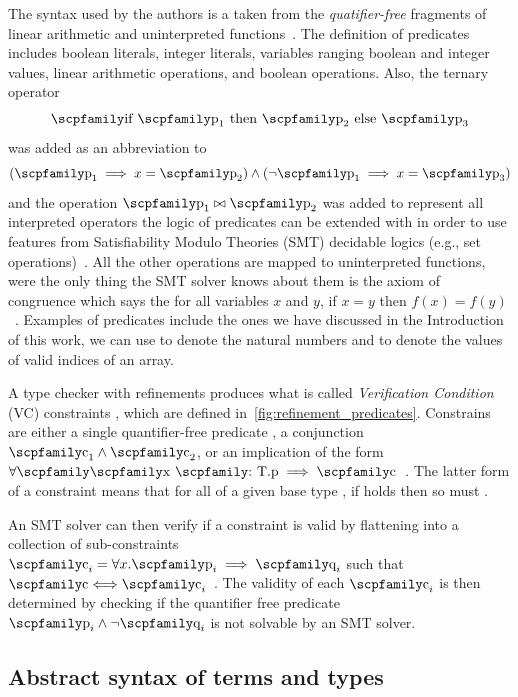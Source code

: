 \documentclass[
  oneside,
  english,
  coorientadorbanca,
  noabntexcite
]{ufsc-thesis-rn46-2019}
\newcommand{\codett}[1]{\text{\scpfamily#1}}
\newcommand{\code}[1]{\text{\scpfamily\setlength\spaceskip{0.35em}#1}}
\newcommand{\typer}[2]{\code{#1 \codett{:} #2}}
\begin{document}
The syntax used by the authors is a taken from the \textit{quatifier-free} fragments of linear arithmetic and uninterpreted functions~\cite{jhala2020tutorial}.
The definition of predicates \code{p} includes boolean literals, integer literals, variables ranging boolean and integer values, linear arithmetic operations, and boolean operations.
Also, the ternary operator
\begin{equation*}
  \code{if $\code{p}_1$ then $\code{p}_2$ else $\code{p}_3$}
\end{equation*}
was added as an abbreviation to
\begin{equation*}
  (\code{p}_1 \implies x = \code{p}_2)\land(\lnot \code{p}_1 \implies x = \code{p}_3)
\end{equation*}
and the operation $\code{p}_1\bowtie\code{p}_2$ was added to represent all interpreted operators the logic of predicates can be extended with in order to use features from Satisfiability Modulo Theories (SMT) decidable logics (e.g., set operations)~\cite{jhala2020tutorial}.
All the other operations are mapped to uninterpreted functions, were the only thing the SMT solver knows about them is the axiom of congruence which says the for all variables $x$ and $y$, if $x = y$ then $f(x) = f(y)$~\cite{jhala2020tutorial}.
Examples of predicates include the ones we have discussed in the Introduction of this work, we can use \code{0 <= v} to denote the natural numbers and \code{0 <= v \&\& v = length(x)} to denote the values of valid indices of an array.

A type checker with refinements produces what is called \textit{Verification Condition} (VC) constraints \code{c}, which are defined in~\cref{fig:refinement_predicates}.
Constrains are either a single quantifier-free predicate \code{p}, a conjunction $\code{c}_1 \land \code{c}_2$, or an implication of the form $\forall\code{\typer{x}{T}.p}\implies\code{c}$~\cite{jhala2020tutorial}.
The latter form of a constraint means that for all \code{x} of a given base type \code{b}, if \code{p} holds then so must \code{c}.

An SMT solver can then verify if a constraint \code{c} is valid by flattening \code{c} into a collection of sub-constraints $\code{c}_i = \forall x. \code{p}_i \implies \code{q}_i$ such that $\code{c} \Longleftrightarrow \code{c}_i$~\cite{jhala2020tutorial}.
The validity of each $\code{c}_i$ is then determined by checking if the quantifier free predicate $\code{p}_i \land \lnot \code{q}_i$ is not solvable by an SMT solver.

\subsection{Abstract syntax of terms and types}
\end{document}
